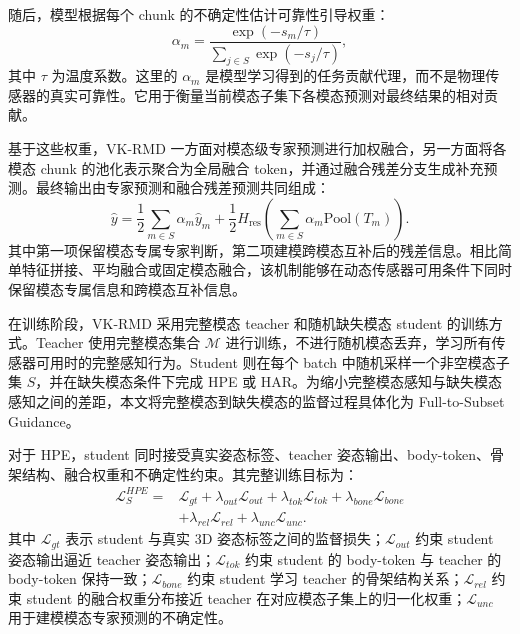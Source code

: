 \documentclass[journal]{IEEEtran}
\begin{document}
随后，模型根据每个 chunk 的不确定性估计可靠性引导权重：
\begin{equation}
    \alpha_m =
    \frac{\exp(-s_m/\tau)}
    {\sum_{j\in S}\exp(-s_j/\tau)} ,
    \label{eq:reliability_weight}
\end{equation}
其中 $\tau$ 为温度系数。这里的 $\alpha_m$ 是模型学习得到的任务贡献代理，而不是物理传感器的真实可靠性。它用于衡量当前模态子集下各模态预测对最终结果的相对贡献。

基于这些权重，VK-RMD 一方面对模态级专家预测进行加权融合，另一方面将各模态 chunk 的池化表示聚合为全局融合 token，并通过融合残差分支生成补充预测。最终输出由专家预测和融合残差预测共同组成：
\begin{equation}
    \hat{y}
    =
    \frac{1}{2}
    \sum_{m\in S}\alpha_m \hat{y}_m
    +
    \frac{1}{2}
    H_{\mathrm{res}}
    \left(
    \sum_{m\in S}\alpha_m \mathrm{Pool}(T_m)
    \right).
    \label{eq:expert_residual_fusion}
\end{equation}
其中第一项保留模态专属专家判断，第二项建模跨模态互补后的残差信息。相比简单特征拼接、平均融合或固定模态融合，该机制能够在动态传感器可用条件下同时保留模态专属信息和跨模态互补信息。

在训练阶段，VK-RMD 采用完整模态 teacher 和随机缺失模态 student 的训练方式。Teacher 使用完整模态集合 $\mathcal{M}$ 进行训练，不进行随机模态丢弃，学习所有传感器可用时的完整感知行为。Student 则在每个 batch 中随机采样一个非空模态子集 $S$，并在缺失模态条件下完成 HPE 或 HAR。为缩小完整模态感知与缺失模态感知之间的差距，本文将完整模态到缺失模态的监督过程具体化为 Full-to-Subset Guidance。

对于 HPE，student 同时接受真实姿态标签、teacher 姿态输出、body-token、骨架结构、融合权重和不确定性约束。其完整训练目标为：
\begin{equation}
\begin{aligned}
\mathcal{L}^{HPE}_{S}
=
&\mathcal{L}_{gt}
+\lambda_{out}\mathcal{L}_{out}
+\lambda_{tok}\mathcal{L}_{tok}
+\lambda_{bone}\mathcal{L}_{bone}  \\
&+\lambda_{rel}\mathcal{L}_{rel}
+\lambda_{unc}\mathcal{L}_{unc}.
\end{aligned}
\label{eq:hpe_student_loss}
\end{equation}
其中 $\mathcal{L}_{gt}$ 表示 student 与真实 3D 姿态标签之间的监督损失；$\mathcal{L}_{out}$ 约束 student 姿态输出逼近 teacher 姿态输出；$\mathcal{L}_{tok}$ 约束 student 的 body-token 与 teacher 的 body-token 保持一致；$\mathcal{L}_{bone}$ 约束 student 学习 teacher 的骨架结构关系；$\mathcal{L}_{rel}$ 约束 student 的融合权重分布接近 teacher 在对应模态子集上的归一化权重；$\mathcal{L}_{unc}$ 用于建模模态专家预测的不确定性。
\end{document}
